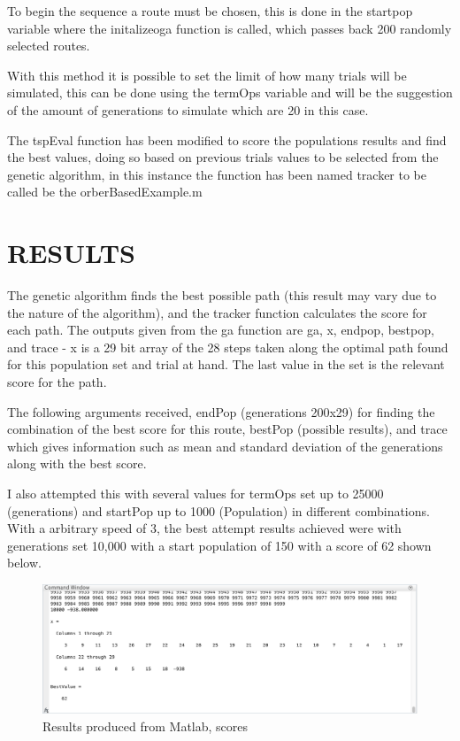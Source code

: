 \documentclass[a4paper, 10pt]{IEEEconf}
\begin{document}
To begin the sequence a route must be chosen, this is done in the startpop variable where the initalizeoga function is called, which passes back 200 randomly selected routes.

With this method it is possible to set the limit of how many trials will be simulated, this can be done using the termOps variable and will be the suggestion of the amount of generations to simulate which are 20 in this case.

The tspEval function has been modified to score the populations results and find the best values, doing so based on previous trials values to be selected from the genetic algorithm, in this instance the function has been named tracker to be called be the orberBasedExample.m

\section{RESULTS}

The genetic algorithm finds the best possible path (this result may vary due to the nature of the algorithm), and the tracker function calculates the score for each path. The outputs given from the ga function are ga, x, endpop, bestpop, and trace - x is a 29 bit array of the 28 steps taken along the optimal path found for this population set and trial at hand. The last value in the set is the relevant score for the path.

The following arguments received, endPop (generations 200x29) for finding the combination of the best score for this route, bestPop (possible results), and trace which gives information such as mean and standard deviation of the generations along with the best score. 

I also attempted this with several values for termOps set up to 25000 (generations) and startPop up to 1000 (Population) in different combinations. With a arbitrary speed of 3, the best attempt results achieved were with generations set 10,000 with a start population of 150  with a score of 62 shown below.

\begin{figure}[H]
  \includegraphics[width=\linewidth, center]{images/score}
  \caption{Results produced from Matlab, scores}
  \label{fig:Results produced from Matlab, scores}
\end{figure}
\end{document}
